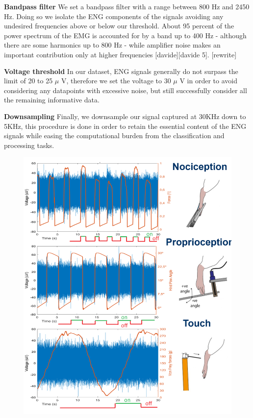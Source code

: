 \documentclass{Configuration_Files/PoliMi3i_thesis}
\begin{document}
\textbf{Bandpass filter} \quad We set a bandpass filter with a range between 800 Hz and 2450 Hz.
Doing so we isolate the ENG components of the signals avoiding any undesired frequencies above or below our threshold.
About 95 percent of the power spectrum of the EMG is accounted for by a band up to 400 Hz - although there are some harmonics up to 800 Hz - while amplifier noise makes an important contribution only at higher frequencies [davide][davide 5].
[rewrite]

\textbf{Voltage threshold} \quad In our dataset, ENG signals generally do not surpass the limit of 20 to 25 \(\mu \) V, therefore we set the voltage to 30 \(\mu \) V in order to avoid considering any datapoints with excessive noise, but still successfully consider all the remaining informative data.

\textbf{Downsampling} \quad Finally, we downsample our signal captured at 30KHz down to 5KHz, this procedure is done in order to retain the essential content of the ENG signals while easing the computational burden from the classification and processing tasks.

\begin{figure}[H]
	\includegraphics[scale=0.4]{acquiredStimuli.png}
	\centering
	\end{figure}
\end{document}
